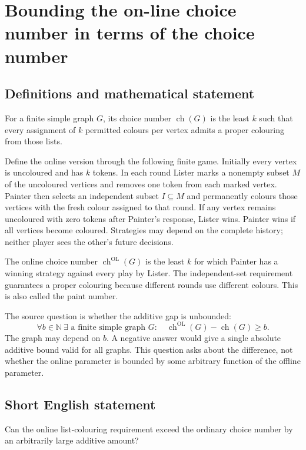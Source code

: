 \documentclass[11pt,a4paper]{article}
\begin{document}
\section*{Bounding the on-line choice number in terms of the choice number}\label{statement}

\subsection{Definitions and mathematical statement}
For a finite simple graph $G$, its choice number $\operatorname{ch}(G)$ is
the least $k$ such that every assignment of $k$ permitted colours per
vertex admits a proper colouring from those lists.

Define the online version through the following finite game. Initially
every vertex is uncoloured and has $k$ tokens. In each round Lister marks
a nonempty subset $M$ of the uncoloured vertices and removes one token
from each marked vertex. Painter then selects an independent subset
$I\subseteq M$ and permanently colours those vertices with the fresh
colour assigned to that round. If any vertex remains uncoloured with
zero tokens after Painter's response, Lister wins. Painter wins if all
vertices become coloured. Strategies may depend on the complete history;
neither player sees the other's future decisions.

The online choice number $\operatorname{ch}^{\mathrm{OL}}(G)$ is the least
$k$ for which Painter has a winning strategy against every play by Lister.
The independent-set requirement guarantees a proper colouring because
different rounds use different colours. This is also called the paint
number.

The source question is whether the additive gap is unbounded:
\[
 \forall b\in\mathbb N\ \exists\text{ a finite simple graph }G:
 \quad\operatorname{ch}^{\mathrm{OL}}(G)-\operatorname{ch}(G)\ge b.
\]
The graph may depend on $b$. A negative answer would give a single
absolute additive bound valid for all graphs. This question asks about
the difference, not whether the online parameter is bounded by some
arbitrary function of the offline parameter.
\subsection{Short English statement}
Can the online list-colouring requirement exceed the ordinary choice number by an arbitrarily large additive amount?
\end{document}
